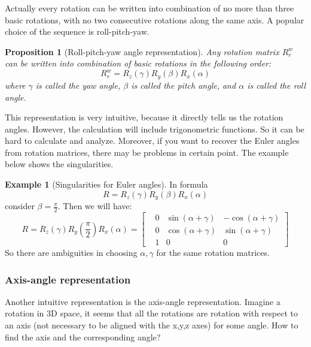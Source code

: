 \documentclass[
]{book}
\newtheorem{proposition}{Proposition}[chapter]
\theoremstyle{definition}
\theoremstyle{definition}
\newtheorem{example}{Example}[chapter]
\theoremstyle{definition}
\theoremstyle{definition}
\theoremstyle{remark}
\begin{document}
Actually every rotation can be written into combination of no more than three basic rotations, with no two consecutive rotations along the same axis. A popular choice of the sequence is roll-pitch-yaw.

\begin{proposition}[Roll-pitch-yaw angle representation]
\protect\hypertarget{prp:roll-pitch-yaw}{}\label{prp:roll-pitch-yaw}Any rotation matrix \(R^w_r\) can be written into combination of basic rotations in the following order:\[R^w_r = R_z(\gamma)R_y(\beta)R_x(\alpha)\]
where \(\gamma\) is called the yaw angle, \(\beta\) is called the pitch angle, and \(\alpha\) is called the roll angle.
\end{proposition}

This representation is very intuitive, because it directly tells us the rotation angles. However, the calculation will include trigonometric functions. So it can be hard to calculate and analyze. Moreover, if you want to recover the Euler angles from
rotation matrices, there may be problems in certain point. The example below shows the singularities.

\begin{example}[Singularities for Euler angles]
\protect\hypertarget{exm:singulareuler}{}\label{exm:singulareuler}In formula \[R = R_z(\gamma)R_y(\beta)R_x(\alpha)\]
consider \(\beta = \frac{\pi}{2}\). Then we will have:
\[R = R_z(\gamma)R_y(\frac{\pi}{2})R_x(\alpha) = \begin{bmatrix}
    &0 &\sin(\alpha+\gamma) &-\cos(\alpha+\gamma)\\
    &0 &\cos(\alpha+\gamma)  &\sin(\alpha+\gamma)\\
    &1            &0             &0
\end{bmatrix}\]
So there are ambiguities in choosing \(\alpha,\gamma\) for the same rotation matrices.
\end{example}

\hypertarget{axis-angle-representation}{%
\subsubsection{Axis-angle representation}\label{axis-angle-representation}}

Another intuitive representation is the axis-angle representation. Imagine a rotation in 3D space, it seems that all the rotations are rotation with respect to an axis (not necessary to be aligned with the x,y,z axes) for some angle. How to find the axis and the corresponding angle?
\end{document}
